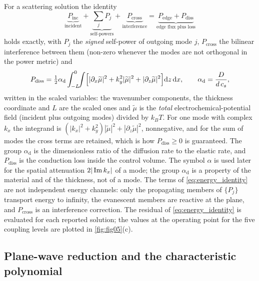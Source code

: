 For a scattering solution the identity
\begin{equation}
\label{eq:energy_identity}
\underbrace{P_{\text{inc}}}_{\text{incident}}
+\underbrace{\sum_{j}P_j}_{\text{self-powers}}
+\underbrace{P_{\text{cross}}}_{\text{interference}}
=\underbrace{P_{\text{edge}}+P_{\text{diss}}}_{\text{edge flux plus loss}}
\end{equation}
holds exactly, with $P_j$ the \emph{signed} self-power of outgoing mode $j$,
$P_{\text{cross}}$ the bilinear interference between them (non-zero whenever the
modes are not orthogonal in the power metric) and
\begin{equation}
\label{eq:dissipation}
P_{\text{diss}}=\tfrac12\alpha_{\mathrm{d}}\int_{-L}^{0}\!\!\int
\Bigl[|\partial_x\widetilde\mu|^{2}+k_y^2|\widetilde\mu|^2+|\partial_z\widetilde\mu|^2\Bigr]\mathrm{d} z\,\mathrm{d} x ,
\qquad \alpha_{\mathrm{d}}=\frac{D}{d\,c_s},
\end{equation}
written in the scaled variables: the wavenumber
components, the thickness coordinate and $L$ are the scaled ones and
$\widetilde\mu$ is the \emph{total} electrochemical-potential field (incident plus
outgoing modes) divided by $k_BT$.  For one mode with complex $k_x$ the integrand
is $(|k_x|^{2}+k_y^{2})|\widetilde\mu|^{2}+|\partial_z\widetilde\mu|^{2}$, nonnegative, and for the sum
of modes the cross terms are retained, which is how
$P_{\text{diss}}\ge0$ is guaranteed.  The group
$\alpha_{\mathrm{d}}$ is the dimensionless ratio of the diffusion rate to the
elastic rate, and $P_{\text{diss}}$ is the conduction loss inside the control volume.  The symbol $\alpha$ is used later for the spatial attenuation
$2|\operatorname{Im} k_x|$ of a mode; the group
$\alpha_{\mathrm{d}}$ is a property of the material and of the thickness, not of
a mode.  The terms of
\eqref{eq:energy_identity} are not independent energy channels: only the
propagating members of $\{P_j\}$ transport energy to infinity, the evanescent
members are reactive at the plane, and $P_{\text{cross}}$ is an interference
correction.  The residual of \eqref{eq:energy_identity} is evaluated for each reported solution; the values at the operating point for the five coupling levels are plotted in \cref{fig:fig05}(c).

\subsection{Plane-wave reduction and the characteristic polynomial}
\label{sec:governing_reduction}

